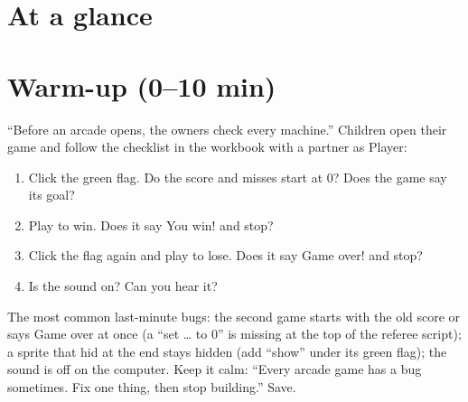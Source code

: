 \section{At a glance}
\begin{timeplan}
\end{timeplan}

\section{Warm-up (0--10 min)}
\begin{bughunt}
\enquote{Before an arcade opens, the owners check every machine.} Children open their game and follow the checklist in the workbook with a partner as Player:
\begin{enumerate}[leftmargin=1.4em,itemsep=1pt]
  \item Click the green flag. Do the score and misses start at 0? Does the game say its goal?
  \item Play to win. Does it say You win! and stop?
  \item Click the flag again and play to lose. Does it say Game over! and stop?
  \item Is the sound on? Can you hear it?
\end{enumerate}
The most common last-minute bugs: the second game starts with the old score or says Game over at once (a \enquote{set \ldots{} to 0} is missing at the top of the referee script); a sprite that hid at the end stays hidden (add \enquote{show} under its green flag); the sound is off on the computer. Keep it calm: \enquote{Every arcade game has a bug sometimes. Fix one thing, then stop building.} Save.
\end{bughunt}

